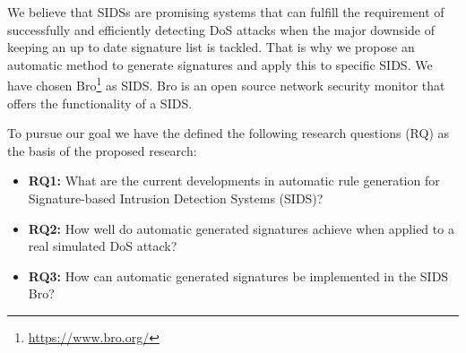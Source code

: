We believe that SIDSs are promising systems that can fulfill the requirement of successfully and efficiently detecting DoS attacks when the major downside of keeping an up to date signature list is tackled. That is why we propose an automatic method to generate signatures and apply this to specific SIDS. We have chosen Bro\footnote{\url{https://www.bro.org/}} as SIDS. Bro is an open source network security monitor that offers the functionality of a SIDS. 



To pursue our goal we have the defined the following research questions (RQ) as the basis of the proposed research:





\begin{itemize}	
	\item \textbf{RQ1:} What are the current developments in automatic rule generation for Signature-based Intrusion Detection Systems (SIDS)?
	\item \textbf{RQ2:} How well do automatic generated signatures achieve when applied to a real simulated DoS attack?
	 \item \textbf{RQ3:} How can automatic generated signatures be implemented in the SIDS Bro?
\end{itemize}







